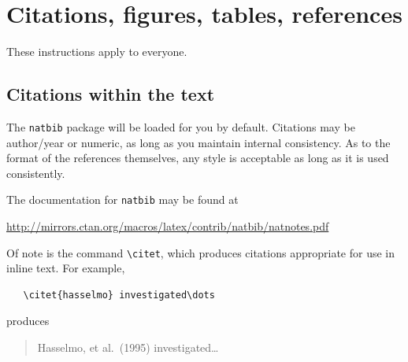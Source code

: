 \documentclass{article}
\begin{document}








\section{Citations, figures, tables, references}
\label{others}

These instructions apply to everyone.

\subsection{Citations within the text}

The \verb+natbib+ package will be loaded for you by default.  Citations may be
author/year or numeric, as long as you maintain internal consistency.  As to the
format of the references themselves, any style is acceptable as long as it is
used consistently.

The documentation for \verb+natbib+ may be found at
\begin{center}
  \url{http://mirrors.ctan.org/macros/latex/contrib/natbib/natnotes.pdf}
\end{center}
Of note is the command \verb+\citet+, which produces citations appropriate for
use in inline text.  For example,
\begin{verbatim}
   \citet{hasselmo} investigated\dots
\end{verbatim}
produces
\begin{quote}
  Hasselmo, et al.\ (1995) investigated\dots
\end{quote}
\end{document}
